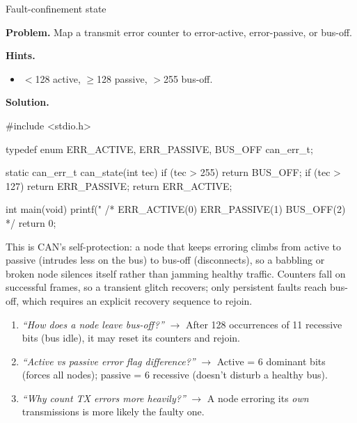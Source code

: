 \begin{gymproblem}{Fault-confinement state}

\textbf{Problem.} Map a transmit error counter to error-active, error-passive,
or bus-off.

\textbf{Hints.}
\begin{itemize}
\item $<$128 active, $\geq$128 passive, $>$255 bus-off.
\end{itemize}

\attempt

\textbf{Solution.}
\begin{cgym}
#include <stdio.h>

typedef enum { ERR_ACTIVE, ERR_PASSIVE, BUS_OFF } can_err_t;

static can_err_t can_state(int tec) {
    if (tec > 255) return BUS_OFF;
    if (tec > 127) return ERR_PASSIVE;
    return ERR_ACTIVE;
}

int main(void) {
    printf("%
    /* ERR_ACTIVE(0) ERR_PASSIVE(1) BUS_OFF(2) */
    return 0;
}
\end{cgym}

This is CAN's self-protection: a node that keeps erroring climbs from active to
passive (intrudes less on the bus) to bus-off (disconnects), so a babbling or
broken node silences itself rather than jamming healthy traffic. Counters fall on
successful frames, so a transient glitch recovers; only persistent faults reach
bus-off, which requires an explicit recovery sequence to rejoin.

\followups
\begin{enumerate}
\item \emph{``How does a node leave bus-off?''} $\rightarrow$ After 128
  occurrences of 11 recessive bits (bus idle), it may reset its counters and
  rejoin.
\item \emph{``Active vs passive error flag difference?''} $\rightarrow$ Active =
  6 dominant bits (forces all nodes); passive = 6 recessive (doesn't disturb a
  healthy bus).
\item \emph{``Why count TX errors more heavily?''} $\rightarrow$ A node erroring
  its \emph{own} transmissions is more likely the faulty one.
\end{enumerate}
\end{gymproblem}

